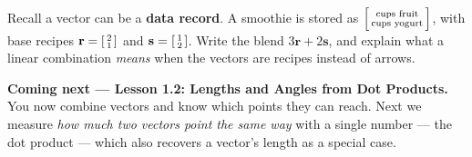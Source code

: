 \documentclass[10pt]{article}
\begin{document}
\begin{extensionbox}
Recall a vector can be a \textbf{data record}. A smoothie is stored as
$\begin{bsmallmatrix} \text{cups fruit} \\ \text{cups yogurt} \end{bsmallmatrix}$, with base
recipes $\mathbf{r}=\begin{bsmallmatrix} 2 \\ 1 \end{bsmallmatrix}$ and
$\mathbf{s}=\begin{bsmallmatrix} 1 \\ 2 \end{bsmallmatrix}$. Write the blend $3\mathbf{r}+2\mathbf{s}$,
and explain what a linear combination \emph{means} when the vectors are recipes instead of
arrows. 
\end{extensionbox}

\begin{spiralbox}
\textbf{Coming next --- Lesson 1.2: Lengths and Angles from Dot Products.} You now combine
vectors and know which points they can reach. Next we measure \emph{how much two vectors point
the same way} with a single number --- the dot product --- which also recovers a vector's
length as a special case.
\end{spiralbox}
\end{document}
